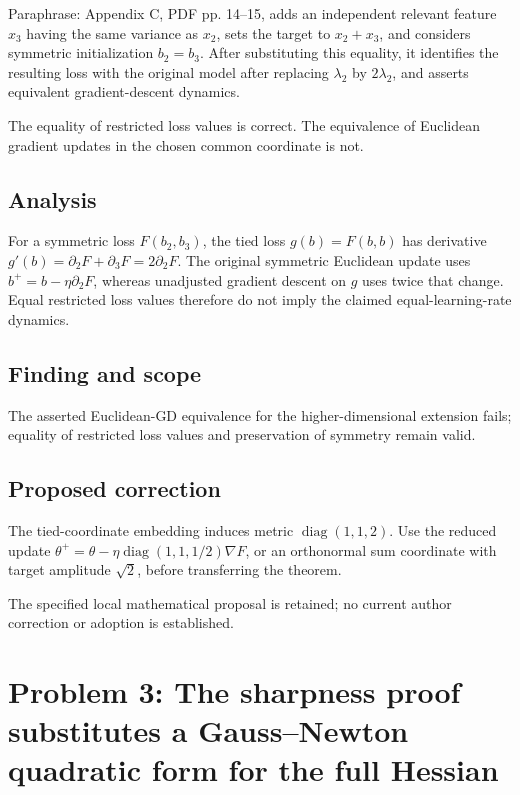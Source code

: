\documentclass[11pt]{article}
\begin{document}
Paraphrase: Appendix C, PDF pp. 14–15, adds an independent relevant feature \(x_3\) having the same variance as \(x_2\), sets the target to \(x_2+x_3\), and considers symmetric initialization \(b_2=b_3\). After substituting this equality, it identifies the resulting loss with the original model after replacing \(\lambda_2\) by \(2\lambda_2\), and asserts equivalent gradient-descent dynamics.

The equality of restricted loss values is correct. The equivalence of Euclidean gradient updates in the chosen common coordinate is not.

\subsection*{Analysis}

For a symmetric loss \(F(b_2,b_3)\), the tied loss \(g(b)=F(b,b)\) has derivative \(g'(b)=\partial_2F+\partial_3F=2\partial_2F\). The original symmetric Euclidean update uses \(b^+=b-\eta\partial_2F\), whereas unadjusted gradient descent on \(g\) uses twice that change. Equal restricted loss values therefore do not imply the claimed equal-learning-rate dynamics.

\subsection*{Finding and scope}

The asserted Euclidean-GD equivalence for the higher-dimensional extension fails; equality of restricted loss values and preservation of symmetry remain valid.

\subsection*{Proposed correction}

The tied-coordinate embedding induces metric \(\operatorname{diag}(1,1,2)\). Use the reduced update \(\theta^+=\theta-\eta\operatorname{diag}(1,1,1/2)\nabla F\), or an orthonormal sum coordinate with target amplitude \(\sqrt2\), before transferring the theorem.

The specified local mathematical proposal is retained; no current author correction or adoption is established.

\section*{Problem 3: The sharpness proof substitutes a Gauss–Newton quadratic form for the full Hessian}
\end{document}
